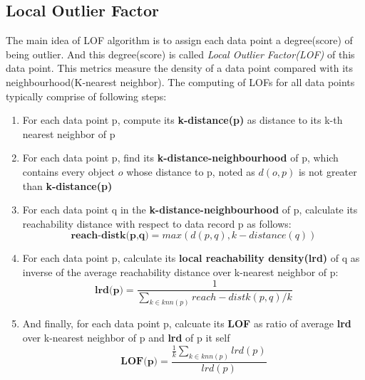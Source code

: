 \documentclass[11pt]{article}       %
\begin{document}
\subsection{Local Outlier Factor} \label{subsect1}

The main idea of LOF algorithm is to assign each data point a degree(score) of being outlier. And this degree(score) is called \textit{Local Outlier Factor(LOF)} of this data point. This metrics measure the density of a data point compared with its neighbourhood(K-nearest neighbor). The computing of LOFs for all data points typically comprise of following steps\cite{Breunig:2000:LID:342009.335388}:

\begin{enumerate} \label{lof_algorithm}
	\item For each data point p, compute its \textbf{k-distance(p)} as distance to its k-th nearest neighbor of p
	\item For each data point p, find its \textbf{k-distance-neighbourhood} of p, which contains every object $o$ whose distance to p, noted as $d(o, p)$ is not greater than \textbf{k-distance(p)}
	\item For each data point q in the \textbf{k-distance-neighbourhood} of p, calculate its reachability distance with respect to data record p as follows:
		\begin{equation} \label{rdist}
			\textbf{reach-distk(p,q)} = max(d(p,q), k-distance(q))
		\end{equation}
	\item For each data point p, calculate its \textbf{local reachability density(lrd)} of q as inverse of the average reachability distance over k-nearest neighbor of p:
		\begin{equation} \label{lrd}
			\textbf{lrd(p)} =  \frac{1}{\sum\limits_{k \in knn(p)} reach-distk(p,q) / k}
		\end{equation}
	\item And finally, for each data point p, calcuate its \textbf{LOF} as ratio of average \textbf{lrd} over k-nearest neighbor of p and \textbf{lrd} of p it self
		\begin{equation} \label{lof}
			\textbf{LOF(p)} = \frac{\frac{1}{k} \sum_{k \in knn(p)} lrd(p)}{lrd(p)}
		\end{equation}
\end{enumerate}
\end{document}
